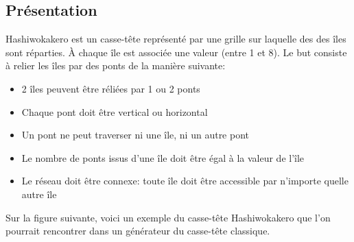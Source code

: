 \documentclass[french]{article}
\begin{document}
    \subsection{\Large Présentation}
    \hspace{0.5 cm} Hashiwokakero est un casse-tête représenté par une grille sur laquelle des des îles sont réparties. \`A chaque île est associée une valeur (entre 1 et 8). Le but consiste à relier les îles par des ponts de la manière suivante:
    \begin{itemize}
        \item 2 îles peuvent être réliées par 1 ou 2 ponts
        \item Chaque pont doit être vertical ou horizontal 
        \item Un pont ne peut traverser ni une île, ni un autre pont
        \item Le nombre de ponts issus d'une île doit être égal à la valeur de l'île
        \item Le réseau doit être connexe: toute île doit être accessible par n'importe quelle autre île
    \end{itemize}
    Sur la figure suivante, voici un exemple du casse-tête Hashiwokakero que l'on pourrait rencontrer dans un générateur du casse-tête classique.\\\\
    \centerline{}
    \label{exempleconcret}
    \centerline{}
    \label{exempleconcretres}
    \vspace{0.5cm}
\end{document}
